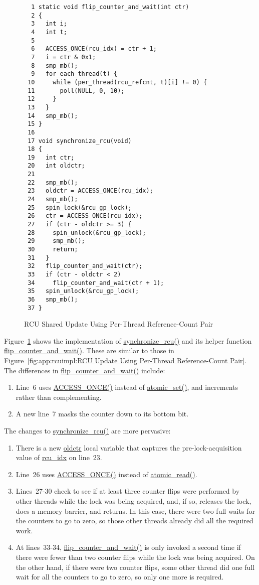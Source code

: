 \begin{figure}[tbp]
{ \scriptsize
\begin{verbatim}
  1 static void flip_counter_and_wait(int ctr)
  2 {
  3   int i;
  4   int t;
  5 
  6   ACCESS_ONCE(rcu_idx) = ctr + 1;
  7   i = ctr & 0x1;
  8   smp_mb();
  9   for_each_thread(t) {
 10     while (per_thread(rcu_refcnt, t)[i] != 0) {
 11       poll(NULL, 0, 10);
 12     }
 13   }
 14   smp_mb();
 15 }
 16 
 17 void synchronize_rcu(void)
 18 {
 19   int ctr;
 20   int oldctr;
 21 
 22   smp_mb();
 23   oldctr = ACCESS_ONCE(rcu_idx);
 24   smp_mb();
 25   spin_lock(&rcu_gp_lock);
 26   ctr = ACCESS_ONCE(rcu_idx);
 27   if (ctr - oldctr >= 3) {
 28     spin_unlock(&rcu_gp_lock);
 29     smp_mb();
 30     return;
 31   }
 32   flip_counter_and_wait(ctr);
 33   if (ctr - oldctr < 2)
 34     flip_counter_and_wait(ctr + 1);
 35   spin_unlock(&rcu_gp_lock);
 36   smp_mb();
 37 }
\end{verbatim}
}
\caption{RCU Shared Update Using Per-Thread Reference-Count Pair}
\label{fig:app:rcuimpl:RCU Shared Update Using Per-Thread Reference-Count Pair}
\end{figure}

Figure~\ref{fig:app:rcuimpl:RCU Shared Update Using Per-Thread Reference-Count Pair}
shows the implementation of \url{synchronize_rcu()} and its helper
function \url{flip_counter_and_wait()}.
These are similar to those in
Figure~\ref{fig:app:rcuimpl:RCU Update Using Per-Thread Reference-Count Pair}.
The differences in \url{flip_counter_and_wait()} include:
\begin{enumerate}
\item	Line~6 uses \url{ACCESS_ONCE()} instead of \url{atomic_set()},
	and increments rather than complementing.
\item	A new line~7 masks the counter down to its bottom bit.
\end{enumerate}

The changes to \url{synchronize_rcu()} are more pervasive:
\begin{enumerate}
\item	There is a new \url{oldctr} local variable that captures
	the pre-lock-acquisition value of \url{rcu_idx} on
	line~23.
\item	Line~26 uses \url{ACCESS_ONCE()} instead of \url{atomic_read()}.
\item	Lines~27-30 check to see if at least three counter flips were
	performed by other threads while the lock was being acquired,
	and, if so, releases the lock, does a memory barrier, and returns.
	In this case, there were two full waits for the counters to
	go to zero, so those other threads already did all the required work.
\item	At lines~33-34, \url{flip_counter_and_wait()} is only
	invoked a second time if there were fewer than two counter flips
	while the lock was being acquired.
	On the other hand, if there were two counter flips, some other
	thread did one full wait for all the counters to go to zero,
	so only one more is required.
\end{enumerate}

